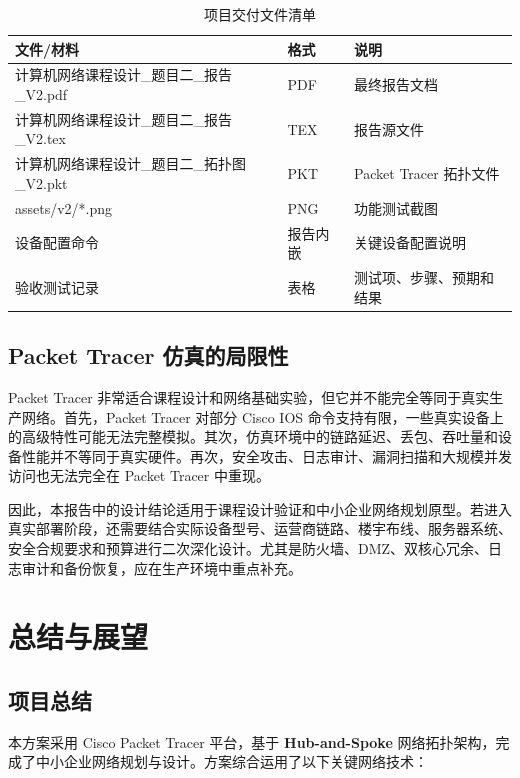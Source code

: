 \documentclass[12pt,a4paper]{ctexart}
\begin{document}
\begin{table}[H]
\centering
\caption{项目交付文件清单}
\label{tab:delivery}
\begin{tabular}{|p{5cm}|p{4cm}|p{5cm}|}
\hline
\textbf{文件/材料} & \textbf{格式} & \textbf{说明} \\ \hline
计算机网络课程设计\_题目二\_报告\_V2.pdf & PDF & 最终报告文档 \\ \hline
计算机网络课程设计\_题目二\_报告\_V2.tex & TEX & 报告源文件 \\ \hline
计算机网络课程设计\_题目二\_拓扑图\_V2.pkt & PKT & Packet Tracer 拓扑文件 \\ \hline
assets/v2/*.png & PNG & 功能测试截图 \\ \hline
设备配置命令 & 报告内嵌 & 关键设备配置说明 \\ \hline
验收测试记录 & 表格 & 测试项、步骤、预期和结果 \\ \hline
\end{tabular}
\end{table}

\subsection{Packet Tracer 仿真的局限性}

Packet Tracer 非常适合课程设计和网络基础实验，但它并不能完全等同于真实生产网络。首先，Packet Tracer 对部分 Cisco IOS 命令支持有限，一些真实设备上的高级特性可能无法完整模拟。其次，仿真环境中的链路延迟、丢包、吞吐量和设备性能并不等同于真实硬件。再次，安全攻击、日志审计、漏洞扫描和大规模并发访问也无法完全在 Packet Tracer 中重现。

因此，本报告中的设计结论适用于课程设计验证和中小企业网络规划原型。若进入真实部署阶段，还需要结合实际设备型号、运营商链路、楼宇布线、服务器系统、安全合规要求和预算进行二次深化设计。尤其是防火墙、DMZ、双核心冗余、日志审计和备份恢复，应在生产环境中重点补充。

\section{总结与展望}

\subsection{项目总结}

本方案采用 Cisco Packet Tracer 平台，基于 \textbf{Hub-and-Spoke} 网络拓扑架构，完成了中小企业网络规划与设计。方案综合运用了以下关键网络技术：
\end{document}
